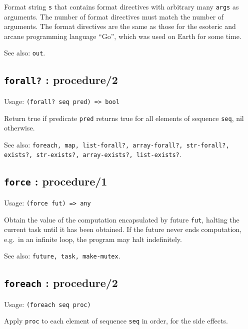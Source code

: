 \documentclass[
]{article}
\newcommand{\passthrough}[1]{#1}
\begin{document}
Format string \passthrough{\lstinline!s!} that contains format
directives with arbitrary many \passthrough{\lstinline!args!} as
arguments. The number of format directives must match the number of
arguments. The format directives are the same as those for the esoteric
and arcane programming language ``Go'', which was used on Earth for some
time.

See also: \passthrough{\lstinline!out!}.

\hypertarget{forall-procedure2-1}{%
\subsection{\texorpdfstring{\texttt{forall?} :
procedure/2}{forall? : procedure/2}}\label{forall-procedure2-1}}

Usage: \passthrough{\lstinline!(forall? seq pred) => bool!}

Return true if predicate \passthrough{\lstinline!pred!} returns true for
all elements of sequence \passthrough{\lstinline!seq!}, nil otherwise.

See also:
\passthrough{\lstinline!foreach, map, list-forall?, array-forall?, str-forall?, exists?, str-exists?, array-exists?, list-exists?!}.

\hypertarget{force-procedure1-1}{%
\subsection{\texorpdfstring{\texttt{force} :
procedure/1}{force : procedure/1}}\label{force-procedure1-1}}

Usage: \passthrough{\lstinline!(force fut) => any!}

Obtain the value of the computation encapsulated by future
\passthrough{\lstinline!fut!}, halting the current task until it has
been obtained. If the future never ends computation, e.g.~in an infinite
loop, the program may halt indefinitely.

See also: \passthrough{\lstinline!future, task, make-mutex!}.

\hypertarget{foreach-procedure2-1}{%
\subsection{\texorpdfstring{\texttt{foreach} :
procedure/2}{foreach : procedure/2}}\label{foreach-procedure2-1}}

Usage: \passthrough{\lstinline!(foreach seq proc)!}

Apply \passthrough{\lstinline!proc!} to each element of sequence
\passthrough{\lstinline!seq!} in order, for the side effects.
\end{document}
